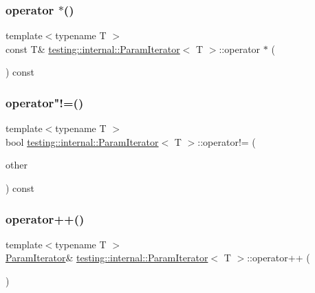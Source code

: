 \subsubsection{\texorpdfstring{operator $\ast$()}{operator *()}}
{\footnotesize\ttfamily template$<$typename T $>$ \\
const T\& \mbox{\hyperlink{classtesting_1_1internal_1_1ParamIterator}{testing\+::internal\+::\+Param\+Iterator}}$<$ T $>$\+::operator $\ast$ (\begin{DoxyParamCaption}{ }\end{DoxyParamCaption}) const\hspace{0.3cm}{\ttfamily [inline]}}

\mbox{\label{classtesting_1_1internal_1_1ParamIterator_a7a6aee04e8e44b5c8294929951cfac2b}} 
\subsubsection{\texorpdfstring{operator"!=()}{operator!=()}}
{\footnotesize\ttfamily template$<$typename T $>$ \\
bool \mbox{\hyperlink{classtesting_1_1internal_1_1ParamIterator}{testing\+::internal\+::\+Param\+Iterator}}$<$ T $>$\+::operator!= (\begin{DoxyParamCaption}\item[{const \mbox{\hyperlink{classtesting_1_1internal_1_1ParamIterator}{Param\+Iterator}}$<$ T $>$ \&}]{other }\end{DoxyParamCaption}) const\hspace{0.3cm}{\ttfamily [inline]}}

\mbox{\label{classtesting_1_1internal_1_1ParamIterator_ab0922f2f554fb3beaf13c442da605e8d}} 
\subsubsection{\texorpdfstring{operator++()}{operator++()}\hspace{0.1cm}{\footnotesize\ttfamily [1/2]}}
{\footnotesize\ttfamily template$<$typename T $>$ \\
\mbox{\hyperlink{classtesting_1_1internal_1_1ParamIterator}{Param\+Iterator}}\& \mbox{\hyperlink{classtesting_1_1internal_1_1ParamIterator}{testing\+::internal\+::\+Param\+Iterator}}$<$ T $>$\+::operator++ (\begin{DoxyParamCaption}{ }\end{DoxyParamCaption})\hspace{0.3cm}{\ttfamily [inline]}}

